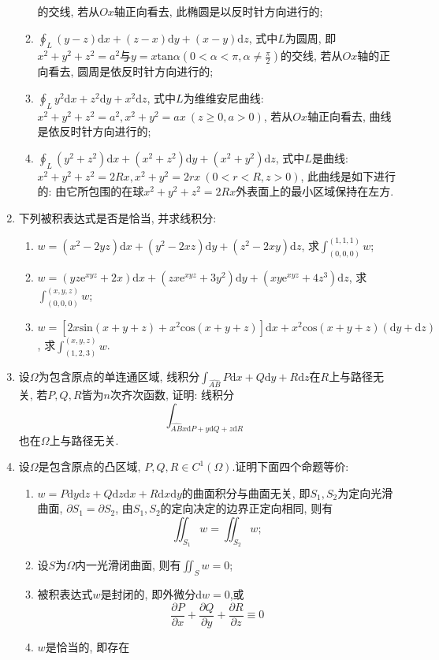 \begin{enumerate}
\begin{enumerate}
	的交线, 若从$Ox$轴正向看去, 此椭圆是以反时针方向进行的;
	\item $\displaystyle{\oint_{L}(y-z)\mathrm{d}x+(z-x)\mathrm{d}y+(x-y)\mathrm{d}z}$, 式中$L$为圆周, 即$x^2+y^2+z^2=a^2$与$y=x\mathrm{tan}\alpha(0<\alpha<\pi,\alpha\ne \frac{\pi}{2})$的交线, 若从$Ox$轴的正向看去, 圆周是依反时针方向进行的;
	\item $\displaystyle{\oint_{L}y^2\mathrm{d}x+z^2\mathrm{d}y+x^2\mathrm{d}z}$, 式中$L$为维维安尼曲线: $x^2+y^2+z^2=a^2, x^2+y^2=ax\ (z\ge 0,a>0)$, 若从$Ox$轴正向看去, 曲线是依反时针方向进行的;
	\item $\displaystyle{\oint_{L}(y^2+z^2)\mathrm{d}x+(x^2+z^2)\mathrm{d}y+(x^2+y^2)\mathrm{d}z}$, 式中$L$是曲线: $x^2+y^2+z^2=2Rx,x^2+y^2=2rx\ (0<r<R, z>0)$, 此曲线是如下进行的: 由它所包围的在球$x^2+y^2+z^2=2Rx$外表面上的最小区域保持在左方.
	\end{enumerate}
	\item 下列被积表达式是否是恰当, 并求线积分:
	\begin{enumerate}
		\item $w=(x^2-2yz)\mathrm{d}x+(y^2-2xz)\mathrm{d}y+(z^2-2xy)\mathrm{d}z$, 求$\displaystyle{\int_{(0,0,0)}^{(1,1,1)}w}$;
		\item $w=(yz\mathrm{e}^{xyz}+2x)\mathrm{d}x+(zx\mathrm{e}^{xyz}+3y^2)\mathrm{d}y+(xy\mathrm{e}^{xyz}+4z^3)\mathrm{d}z$, 求$\displaystyle{\int_{(0,0,0)}^{(x,y,z)}w}$;
		\item $w=[2x\mathrm{sin}(x+y+z)+x^2\mathrm{cos}(x+y+z)]\mathrm{d}x+x^2\mathrm{cos}(x+y+z)(\mathrm{d}y+\mathrm{d}z)$, 求$\displaystyle{\int_{(1,2,3)}^{(x,y,z)}w}$.
		\end{enumerate}
	\item 设$\Omega$为包含原点的单连通区域, 线积分$\displaystyle{\int_{\widehat{AB}}P\mathrm{d}x+Q\mathrm{d}y+R\mathrm{d}z}$在$R$上与路径无关, 若$P,Q,R$皆为$n$次齐次函数, 证明: 线积分$$
		\displaystyle{\int_{\widehat{AB}x\mathrm{d}P+y\mathrm{d}Q+z\mathrm{d}R}}$$
		也在$\Omega$上与路径无关.
		\item 设$\Omega$是包含原点的凸区域, $P,Q, R\in C^1(\Omega)$.证明下面四个命题等价:
		\begin{enumerate}
			\item $w=P\mathrm{d}y\mathrm{d}z+Q\mathrm{d}z\mathrm{d}x+R\mathrm{d}x\mathrm{d}y$的曲面积分与曲面无关, 即$S_1,S_2$为定向光滑曲面, $\partial S_1=\partial S_2$, 由$S_1,S_2$的定向决定的边界正定向相同, 则有
			$$\displaystyle{\iint_{S_1}w=\iint_{S_2}w};$$
			\item 设$S$为$\Omega$内一光滑闭曲面, 则有$\displaystyle{\iint_{S}w=0}$;
				\item 被积表达式$w$是封闭的, 即外微分$\mathrm{d}w=0$,或
				$$ \frac{\partial P}{\partial x}+\frac{\partial Q}{\partial y}+\frac{\partial R}{\partial z}\equiv 0$$
				\item $w$是恰当的, 即存在\\
				

\end{enumerate}
\end{enumerate}

